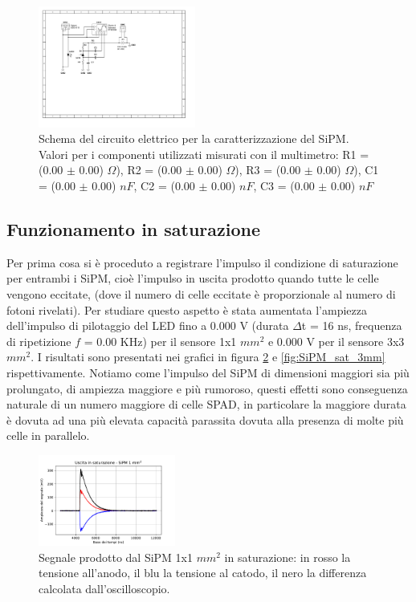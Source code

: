 \documentclass[journal]{IEEEtran}
\begin{document}
\begin{figure}[H]%
\begin{center}
\includegraphics[width=0.46\textwidth]{sch-simulations/output/SiPM.pdf}
\caption{Schema del circuito elettrico per la caratterizzazione del SiPM. Valori per i componenti utilizzati misurati con il multimetro: R1 = (0.00 $\pm$ 0.00) $\Omega$), R2 = (0.00 $\pm$ 0.00) $\Omega$), R3 = (0.00 $\pm$ 0.00) $\Omega$), C1 = (0.00 $\pm$ 0.00) $nF$, C2 = (0.00 $\pm$ 0.00) $nF$, C3 = (0.00 $\pm$ 0.00) $nF$}
\label{fig:oscilloscope}
\end{center}
\end{figure}

\subsection{Funzionamento in saturazione}
Per prima cosa si è proceduto a registrare l'impulso il condizione di saturazione per entrambi i SiPM, cioè l'impulso in uscita prodotto quando tutte le celle vengono eccitate, (dove il numero di celle eccitate è proporzionale al numero di fotoni rivelati). Per studiare questo aspetto è stata aumentata l'ampiezza dell'impulso di pilotaggio del LED fino a 0.000 V (durata $\Delta$t = 16 ns, frequenza di ripetizione $f$ = 0.00 KHz) per il sensore 1x1 $mm^2$ e 0.000 V per il sensore 3x3 $mm^2$. I risultati sono presentati nei grafici in figura \ref{fig:SiPM_sat_1mm} e \ref{fig:SiPM_sat_3mm} rispettivamente. Notiamo come l'impulso del SiPM di dimensioni maggiori sia più prolungato, di ampiezza maggiore e più rumoroso, questi effetti sono conseguenza naturale di un numero maggiore di celle SPAD, in particolare la maggiore durata è dovuta ad una più elevata capacità parassita dovuta alla presenza di molte più celle in parallelo.


\begin{figure}[H]%
\begin{center}
\includegraphics[width=0.40\textwidth]{analysis/output/SiPM_sat_1mm.pdf}
\caption{Segnale prodotto dal SiPM 1x1 $mm^2$ in saturazione: in rosso la tensione all'anodo, il blu la tensione al catodo, il nero la differenza calcolata dall'oscilloscopio.}
\label{fig:SiPM_sat_1mm}
\end{center}
\end{figure}
\end{document}
